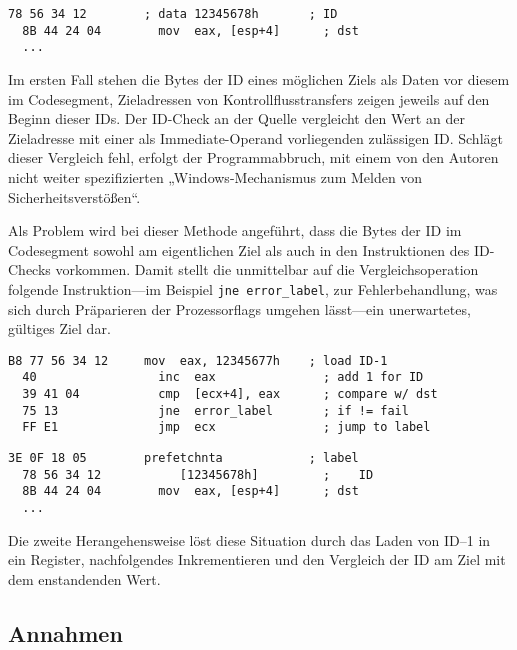 \documentclass[11pt]{article}
\begin{document}
\begin{lstlisting}[title=Ziel]
  78 56 34 12        ; data 12345678h       ; ID
  8B 44 24 04        mov  eax, [esp+4]      ; dst
  ...
\end{lstlisting}

Im ersten Fall stehen die Bytes der ID eines möglichen Ziels als Daten vor
diesem im Codesegment, Zieladressen von Kontrollflusstransfers zeigen jeweils
auf den Beginn dieser IDs. Der ID-Check an der Quelle vergleicht den Wert an
der Zieladresse mit einer als Immediate-Operand vorliegenden zulässigen ID.
Schlägt dieser Vergleich fehl, erfolgt der Programmabbruch, mit einem von den
Autoren nicht weiter spezifizierten „Windows-Mechanismus zum Melden von
Sicherheitsverstößen“.

Als Problem wird bei dieser Methode angeführt, dass die Bytes der ID im
Codesegment sowohl am eigentlichen Ziel als auch in den Instruktionen des
ID-Checks vorkommen. Damit stellt die unmittelbar auf die Vergleichsoperation
folgende Instruktion—im Beispiel \texttt{jne error\_label}, zur
Fehlerbehandlung, was sich durch Präparieren der Prozessorflags umgehen
lässt—ein unerwartetes, gültiges Ziel dar.

\begin{lstlisting}[title=Quelle]
  B8 77 56 34 12     mov  eax, 12345677h    ; load ID-1
  40                 inc  eax               ; add 1 for ID
  39 41 04           cmp  [ecx+4], eax      ; compare w/ dst
  75 13              jne  error_label       ; if != fail
  FF E1              jmp  ecx               ; jump to label
\end{lstlisting}

\begin{lstlisting}[title=Ziel]
  3E 0F 18 05        prefetchnta            ; label
  78 56 34 12           [12345678h]         ;    ID
  8B 44 24 04        mov  eax, [esp+4]      ; dst
  ...
\end{lstlisting}

Die zweite Herangehensweise löst diese Situation durch das Laden von ID–1 in
ein Register, nachfolgendes Inkrementieren und den Vergleich der ID am Ziel mit
dem enstandenden Wert.

\subsection{Annahmen}
\end{document}

